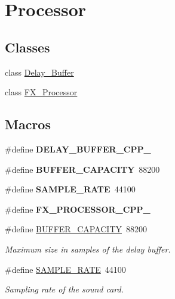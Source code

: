 \hypertarget{group___f_x}{\section{Processor}
\label{group___f_x}
}
\subsection*{Classes}
\begin{DoxyCompactItemize}
\item 
class \hyperlink{class_delay___buffer}{Delay\+\_\+\+Buffer}
\item 
class \hyperlink{class_f_x___processor}{F\+X\+\_\+\+Processor}
\end{DoxyCompactItemize}
\subsection*{Macros}
\begin{DoxyCompactItemize}
\item 
\hypertarget{group___f_x_gaef3865820e4634371db0261a9b0a9877}{\#define {\bfseries D\+E\+L\+A\+Y\+\_\+\+B\+U\+F\+F\+E\+R\+\_\+\+C\+P\+P\+\_\+}}\label{group___f_x_gaef3865820e4634371db0261a9b0a9877}

\item 
\hypertarget{group___f_x_ga473776433ac44bc525b8cd5186969b4b}{\#define {\bfseries B\+U\+F\+F\+E\+R\+\_\+\+C\+A\+P\+A\+C\+I\+T\+Y}~88200}\label{group___f_x_ga473776433ac44bc525b8cd5186969b4b}

\item 
\hypertarget{group___f_x_ga4b76a0c2859cfd819a343a780070ee2b}{\#define {\bfseries S\+A\+M\+P\+L\+E\+\_\+\+R\+A\+T\+E}~44100}\label{group___f_x_ga4b76a0c2859cfd819a343a780070ee2b}

\item 
\hypertarget{group___f_x_ga7814ab808e89cbde6ae474e691d7c6ea}{\#define {\bfseries F\+X\+\_\+\+P\+R\+O\+C\+E\+S\+S\+O\+R\+\_\+\+C\+P\+P\+\_\+}}\label{group___f_x_ga7814ab808e89cbde6ae474e691d7c6ea}

\item 
\hypertarget{group___f_x_ga473776433ac44bc525b8cd5186969b4b}{\#define \hyperlink{group___f_x_ga473776433ac44bc525b8cd5186969b4b}{B\+U\+F\+F\+E\+R\+\_\+\+C\+A\+P\+A\+C\+I\+T\+Y}~88200}\label{group___f_x_ga473776433ac44bc525b8cd5186969b4b}

\begin{DoxyCompactList}\small\item\em Maximum size in samples of the delay buffer. \end{DoxyCompactList}\item 
\hypertarget{group___f_x_ga4b76a0c2859cfd819a343a780070ee2b}{\#define \hyperlink{group___f_x_ga4b76a0c2859cfd819a343a780070ee2b}{S\+A\+M\+P\+L\+E\+\_\+\+R\+A\+T\+E}~44100}\label{group___f_x_ga4b76a0c2859cfd819a343a780070ee2b}

\begin{DoxyCompactList}\small\item\em Sampling rate of the sound card. \end{DoxyCompactList}\end{DoxyCompactItemize}
